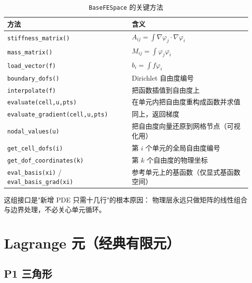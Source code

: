 \documentclass[UTF8,11pt,oneside]{ctexbook}
\theoremstyle{definition}
\theoremstyle{plain}
\newenvironment{important}{%
  \begin{tcolorbox}[colback=blue!5,colframe=blue!45,title=要点,fonttitle=\bfseries]%
}{%
  \end{tcolorbox}%
}
\newcommand{\code}[1]{\texttt{#1}}
\begin{document}
\begin{table}[htbp]
\centering
\caption{\code{BaseFESpace} 的关键方法}
\label{tab:space-api}
\begin{lrbox}{\guideTableBox}
\begin{tabular}{@{}L{6.2cm}L{9.2cm}@{}}
\toprule
方法 & 含义 \\
\midrule
\code{stiffness\_\allowbreak matrix()} & $A_{ij}=\int\nabla\varphi_j\cdot\nabla\varphi_i$ \\
\code{mass\_\allowbreak matrix()} & $M_{ij}=\int\varphi_j\varphi_i$ \\
\code{load\_\allowbreak vector(f)} & $b_i=\int f\varphi_i$ \\
\code{boundary\_\allowbreak dofs()} & Dirichlet 自由度编号 \\
\code{interpolate(f)} & 把函数插值到自由度上 \\
\code{evaluate(cell,\allowbreak u,\allowbreak pts)} & 在单元内把自由度重构成函数并求值 \\
\code{evaluate\_\allowbreak gradient(cell,\allowbreak u,\allowbreak pts)} & 同上，返回梯度 \\
\code{nodal\_\allowbreak values(u)} & 把自由度向量还原到网格节点（可视化用） \\
\code{get\_\allowbreak cell\_\allowbreak dofs(i)} & 第 $i$ 个单元的全局自由度编号 \\
\code{get\_\allowbreak dof\_\allowbreak coordinates(k)} & 第 $k$ 个自由度的物理坐标 \\
\code{eval\_\allowbreak basis(xi)} / \code{eval\_\allowbreak basis\_\allowbreak grad(xi)} & 参考单元上的基函数（仅显式基函数空间） \\
\bottomrule
\end{tabular}
\end{lrbox}%
\ifdim\wd\guideTableBox>\linewidth
  \resizebox{\linewidth}{!}{\usebox{\guideTableBox}}%
\else\usebox{\guideTableBox}\fi
\end{table}

\begin{important}
这组接口是"新增 PDE 只需十几行"的根本原因：
物理层永远只做矩阵的线性组合与边界处理，不必关心单元循环。
\end{important}

\section{Lagrange 元（经典有限元）}

\subsection{P1 三角形}
\end{document}
